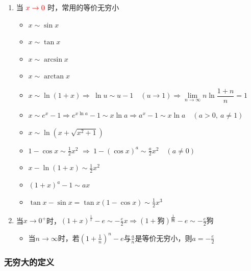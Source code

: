\documentclass[../book.tex]{subfiles}
\begin{document}
    \begin{enumerate}
        \item 当 $\color{red}{x \to 0}$ 时，常用的等价无穷小
        \begin{itemize}
            \item $x \sim \sin x$
            \item $x \sim \tan x$
            \item $x \sim \arcsin x$
            \item $x \sim \arctan x$
            \item $x \sim \ln(1+x) \Rightarrow\ \ln u \sim u - 1 \quad (u \to 1) \Rightarrow \lim\limits_{n\to \infty} n\ln\dfrac{1+n}{n} = 1$
            \item $x \sim e^x - 1 \Rightarrow e^{x\ln a} - 1 \sim x \ln a \Rightarrow a^x - 1 \sim x \ln a \quad (a>0,\ a\neq 1)$
            \item $x \sim \ln\!\left(x + \sqrt{x^2 + 1}\right)$
            \item $1 - \cos x \sim \displaystyle\frac{1}{2}x^2$
            $\Rightarrow\ 1 - (\cos x)^a \sim \displaystyle\frac{a}{2}x^2 \quad (a\neq 0)$
            \item $x - \ln(1 + x) \sim \displaystyle\frac{1}{2}x^2$
            \item $(1+x)^a - 1 \sim ax$
            \item $\tan x - \sin x = \tan x(1 - \cos x) \sim \displaystyle\frac{1}{2}x^3$
        \end{itemize}

        \item 当$x \to 0^+$时，$(1 + x)^{\displaystyle\frac{1}{x}} - e \sim -\displaystyle\frac{e}{2}x \Rightarrow (1 + \text{狗})^{\displaystyle\frac{1}{\text{狗}}} - e \sim -\displaystyle\frac{e}{2}\text{狗}$
        \begin{itemize}
            \item 当$n \to \infty$时，若$(1 + \displaystyle\frac{1}{n})^n - e$与$\displaystyle\frac{a}{n}$是等价无穷小，则$a = -\displaystyle\frac{e}{2}$
        \end{itemize}
    \end{enumerate}

    \subsubsection{无穷大的定义}
\end{document}
